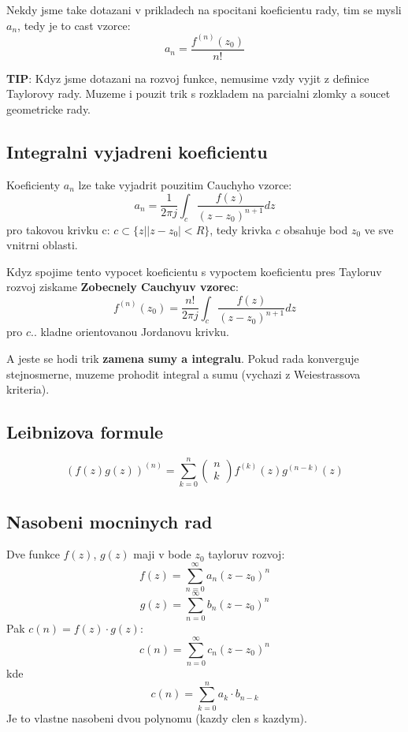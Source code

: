 Nekdy jsme take dotazani v prikladech na spocitani koeficientu rady, tim se mysli $a_n$, tedy je to cast vzorce:
$$a_n = \frac{f^{(n)}(z_0)}{n!}$$

\textbf{TIP}: Kdyz jsme dotazani na rozvoj funkce, nemusime vzdy vyjit z definice Taylorovy rady. Muzeme i pouzit trik s rozkladem na parcialni zlomky a soucet geometricke rady. 

\subsection*{Integralni vyjadreni koeficientu}

Koeficienty $a_n$  lze take vyjadrit pouzitim Cauchyho vzorce:
\begin{equation}
\label{eq:cau_koef}
a_n = \frac{1}{2\pi j} \int_c \frac{f(z)}{(z-z_0)^{n+1}}dz
\end{equation}
pro takovou krivku c: $c \subset \{ z| |z-z_0|<R\}$, tedy krivka $c$ obsahuje bod $z_0$ ve sve vnitrni oblasti.
\vspace{0.5cm}
 
Kdyz spojime tento vypocet koeficientu s vypoctem koeficientu pres Tayloruv rozvoj ziskame \textbf{Zobecnely Cauchyuv vzorec}:
\begin{equation}
\label{eq:cau_obecny}
f^{(n)}(z_0) = \frac{n!}{2\pi j} \int_c \frac{f(z)}{(z-z_0)^{n+1}}dz
\end{equation}
pro $c$.. kladne orientovanou Jordanovu krivku.
\vspace{0.5cm}

A jeste se hodi trik \textbf{zamena sumy a integralu}. Pokud rada konverguje stejnosmerne, muzeme prohodit integral a sumu (vychazi z Weiestrassova kriteria).

\subsection*{Leibnizova formule}
\begin{equation}
\label{eq:leib}
(f(z)g(z))^{(n)} = \sum_{k=0}^n \left( \begin{array}{r}
n\\ k
\end{array} \right) f^{(k)}(z) g^{(n-k)}(z)
\end{equation}

\subsection*{Nasobeni mocninych rad}
Dve funkce $f(z)$, $g(z)$ maji v bode $z_0$ tayloruv rozvoj:
$$f(z) = \sum_{n=0}^\infty a_n (z-z_0)^n$$
$$g(z) = \sum_{n=0}^\infty b_n (z-z_0)^n$$
Pak $c(n) = f(z)\cdot g(z)$:
\begin{equation}
\label{eq:nasob}
c(n) = \sum_{n=0}^\infty c_n (z-z_0)^n
\end{equation}
kde 
$$c(n) = \sum_{k=0}^n a_k \cdot b_{n-k}$$
Je to vlastne nasobeni dvou polynomu (kazdy clen s kazdym).

